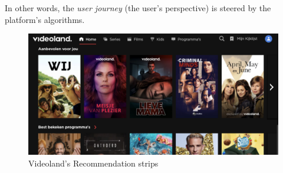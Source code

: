 In other words, the \emph{user journey} (the user's perspective) is steered by the platform's algorithms.


\begin{figure}[h]
  \centering
  \includegraphics[width=\textwidth]{images/VLHome_cropped.png}
  \caption{Videoland's Recommendation strips}
  \label{fig:VLStrip}
\end{figure}

